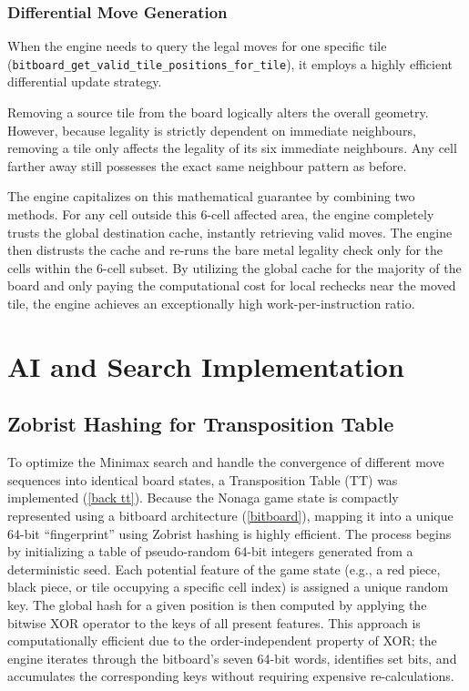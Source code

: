 \subsubsection{Differential Move Generation}
When the engine needs to query the legal moves for one specific tile (\texttt{bitboard\_get\_valid\_tile\_positions\_for\_tile}), it employs a highly efficient differential update strategy.

Removing a source tile from the board logically alters the overall geometry. However, because legality is strictly dependent on immediate neighbours, removing a tile only affects the legality of its six immediate neighbours. Any cell farther away still possesses the exact same neighbour pattern as before.

The engine capitalizes on this mathematical guarantee by combining two methods. For any cell outside this 6-cell affected area, the engine completely trusts the global destination cache, instantly retrieving valid moves. The engine then distrusts the cache and re-runs the bare metal legality check only for the cells within the 6-cell subset. By utilizing the global cache for the majority of the board and only paying the computational cost for local rechecks near the moved tile, the engine achieves an exceptionally high work-per-instruction ratio.

\section{AI and Search Implementation}

\subsection{Zobrist Hashing for Transposition Table} \label{imp zobrist}

To optimize the Minimax search and handle the convergence of different move sequences into identical board states, a Transposition Table (TT) was implemented (\cref{back tt}). Because the Nonaga game state is compactly represented using a bitboard architecture (\cref{bitboard}), mapping it into a unique 64-bit ``fingerprint'' using Zobrist hashing is highly efficient. The process begins by initializing a table of pseudo-random 64-bit integers generated from a deterministic seed. Each potential feature of the game state (e.g., a red piece, black piece, or tile occupying a specific cell index) is assigned a unique random key. The global hash for a given position is then computed by applying the bitwise XOR operator to the keys of all present features. This approach is computationally efficient due to the order-independent property of XOR; the engine iterates through the bitboard’s seven 64-bit words, identifies set bits, and accumulates the corresponding keys without requiring expensive re-calculations.

